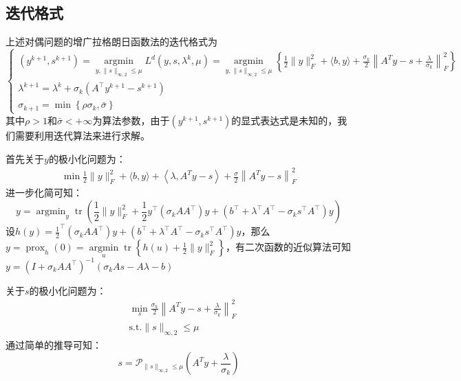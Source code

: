 \documentclass[12pt]{article}
\begin{document}
 \subsection{迭代格式}
 上述对偶问题的增广拉格朗日函数法的迭代格式为
 \begin{equation*}
 \left\{	\begin{array}{l}
 	(y^{k+1},s^{k+1}) =\mathop{\arg\min}\limits_{y,\|s\|_{\infty, 2} \leq \mu}  L^d(y, s, \lambda^k, \mu)=\mathop{\arg\min}\limits_{y,\|s\|_{\infty, 2} \leq \mu} \left\{\frac{1}{2}\|y\|_F^2+\langle b, y\rangle+\frac{\sigma_k}{2}\left\|A^T y -s+\frac{\lambda}{\sigma_k}\right\|_F^2 \right\}\\
 	\lambda^{k+1} = \lambda^{k}+\sigma_k(A^{\top}y^{k+1}-s^{k+1})\\
 	\sigma_{k+1} = \min \left\{\rho \sigma_k,\bar{\sigma}\right\}
 \end{array}\right.
 \end{equation*}
其中$\rho >1$和$\bar{\sigma}< +\infty$为算法参数，由于$(y^{k+1},s^{k+1})$的显式表达式是未知的，我们需要利用迭代算法来进行求解。

首先关于$y$的极小化问题为：
\begin{equation*}
	\begin{aligned}
		\min \frac{1}{2}\|y\|_F^2+\langle b, y\rangle+\left\langle\lambda, A^T y -s\right\rangle+\frac{\sigma}{2}\left\|A^T y -s\right\|_F^2
	\end{aligned}
\end{equation*}
进一步化简可知：
$$
y = \mathop{\arg\min}_y \operatorname{tr}\left(\frac{1}{2}\|y\|_F^2+\frac{1}{2}y^{\top} (\sigma_k A A^{\top}) y + (b^{\top}+\lambda^{\top} A^{\top}-\sigma_k s^{\top}A^{\top})y \right)
$$
 设$h(y) = \frac{1}{2}^{\top} (\sigma_k A A^{\top}) y + (b^{\top}+\lambda^{\top} A^{\top}-\sigma_k s^{\top}A^{\top})y $，那么$y = \operatorname{prox}_h(0) = \mathop{\arg\min}\limits_{u}\operatorname{tr}\left\{ h(u)+\frac{1}{2}\|y\|_F^2\right\}$，有二次函数的近似算法可知$y = \left(I + \sigma_k A A^{\top}\right)^{-1} (\sigma_k As-A \lambda-b)$
 
 关于$s$的极小化问题为：
 \begin{equation*}
 	\begin{aligned}
 		& \min_s \frac{\sigma_k}{2}\left\|A^T y -s+\frac{\lambda}{\sigma_k}\right\|_F^2\\
 		&\text{s.t.} \|s\|_{\infty, 2} \leq \mu
 	\end{aligned}
 \end{equation*}
通过简单的推导可知：
$$
s = \mathcal{P}_{\|s\|_{\infty, 2} \leq \mu}\left(A^T y +\frac{\lambda}{\sigma_k}\right)
$$
 
\end{document}

